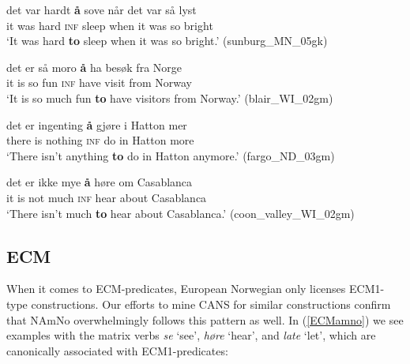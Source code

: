\documentclass[output=paper,colorlinks,citecolor=brown]{langscibook}
\begin{document}
\begin{exe} 

\item \label{mostfrequentinf}

\begin{xlist}


\item \label{infadj1} \gll det var hardt \textbf{{\aa}} sove når det var så lyst \\
        it was hard \textsc{inf} sleep when it was so bright\\
         \glt `It was hard \textbf{to} sleep when it was so bright.' \hfill(sunburg\_MN\_05gk)
         
\item \label{infadj2} \gll det er så moro \textbf{{\aa}} ha besøk fra Norge \\
        it is so fun \textsc{inf} have visit from Norway\\
         \glt `It is so much fun \textbf{to} have visitors from Norway.' \hfill(blair\_WI\_02gm)

\item \label{infnoun1} \gll det er ingenting \textbf{{\aa}} gjøre i Hatton mer \\
        there is nothing \textsc{inf} do in Hatton more \\
         \glt `There isn't anything \textbf{to} do in Hatton anymore.' \hfill(fargo\_ND\_03gm)
         
         \item \label{infnoun2} \gll det er ikke mye \textbf{{\aa}} høre om Casablanca \\
        it is not much \textsc{inf} hear about Casablanca \\
         \glt `There isn't much \textbf{to} hear about Casablanca.' \hfill(coon\_valley\_WI\_02gm)
                  
\end{xlist}
\end{exe}

\subsection{ECM} \label{ecmsection}

When it comes to ECM-predicates, European Norwegian only licenses ECM1-type constructions. Our efforts to mine CANS for similar  constructions confirm that NAmNo overwhelmingly follows this pattern as well. In (\ref{ECMamno}) we see examples with the matrix verbs \textit{se} `see', \textit{høre} `hear', and \textit{late} `let', which are canonically associated with ECM1-predicates:
\end{document}
